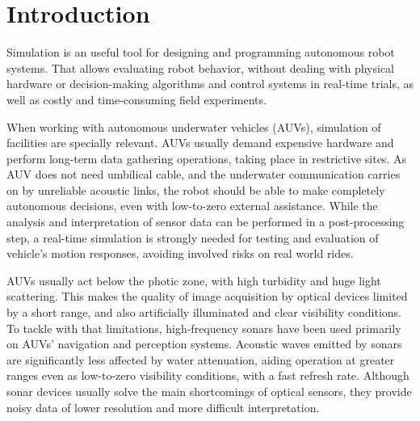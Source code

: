 \documentclass[final,5p,times]{elsarticle}
\begin{document}
\linenumbers

\section{Introduction}
\label{introduction}

Simulation is an useful tool for designing and programming autonomous robot systems. That allows evaluating robot behavior, without dealing with physical hardware or decision-making algorithms and control systems in real-time trials, as well as costly and time-consuming field experiments. 

When working with autonomous underwater vehicles (AUVs), simulation of facilities are specially relevant. AUVs usually demand expensive hardware and perform long-term data gathering operations, taking place in restrictive sites. As AUV does not need umbilical cable, and the underwater communication carries on by unreliable acoustic links, the robot should be able to make completely autonomous decisions, even with low-to-zero external assistance. While the analysis and interpretation of sensor data can be performed in a post-processing step, a real-time simulation is strongly needed for testing and evaluation of vehicle's motion responses, avoiding involved risks on real world rides.

AUVs usually act below the photic zone, with high turbidity and huge light scattering. This makes the quality of image acquisition by optical devices limited by a short range, and also artificially illuminated and clear visibility conditions. To tackle with that limitations, high-frequency sonars have been used primarily on AUVs' navigation and perception systems. Acoustic waves emitted by sonars are significantly less affected by water attenuation, aiding operation at greater ranges even as low-to-zero visibility conditions, with a fast refresh rate. Although sonar devices usually solve the main shortcomings of optical sensors, they provide noisy data of lower resolution and more difficult interpretation.
\end{document}
